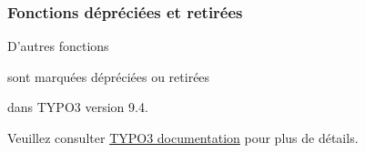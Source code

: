 \begin{frame}[fragile]
	\frametitle{Fonctions dépréciées et retirées}

	\vspace{0.6cm}
	\begin{center}
		D'autres fonctions
	\end{center}
	\vspace{-0.8cm}
	\begin{center}
		sont marquées dépréciées ou retirées
	\end{center}
	\vspace{-0.8cm}
	\begin{center}
		dans TYPO3 version 9.4.
	\end{center}
	\vspace{-0.6cm}
	\begin{center}
		Veuillez consulter \href{https://docs.typo3.org/typo3cms/extensions/core/latest/Changelog/9.4/Index.html#deprecation}{TYPO3 documentation} pour plus de détails.
	\end{center}

\end{frame}

